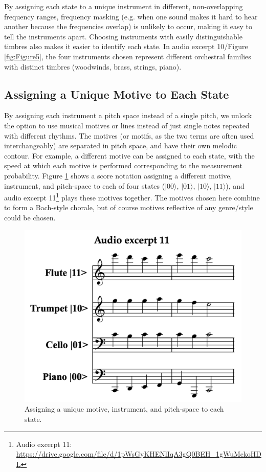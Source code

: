 \documentclass[10pt,twocolumn]{article}
\begin{document}
By assigning each state to a unique instrument in different, non-overlapping frequency ranges, frequency masking (e.g. when one sound makes it hard to hear another because the frequencies overlap) is unlikely to occur, making it easy to tell the instruments apart\cite{smyth2019}. Choosing instruments with easily distinguishable timbres also makes it easier to identify each state. In audio excerpt 10/Figure \ref{fig:Figure5}, the four instruments chosen represent different orchestral families with distinct timbres (woodwinds, brass, strings, piano). 

\subsection{Assigning a Unique Motive to Each State}

By assigning each instrument a pitch space instead of a single pitch, we unlock the option to use musical motives or lines instead of just single notes repeated with different rhythms. The motives (or motifs, as the two terms are often used interchangeably) are separated in pitch space, and have their own melodic contour. For example, a different motive can be assigned to each state, with the speed at which each motive is performed corresponding to the measurement probability. Figure \ref{fig:Figure6} shows a score notation assigning a different motive, instrument, and pitch-space to each of four states ($|00\rangle$, $|01\rangle$, $|10\rangle$, $|11\rangle$), and audio excerpt 11\footnote{Audio excerpt 11: \url{https://drive.google.com/file/d/1pWsGyKHENlIqA3gQ0BEH_1gWuMckoHDL}} plays these motives together. The motives chosen here combine to form a Bach-style chorale, but of course motives reflective of any genre/style could be chosen.

\begin{figure}[h]
\centering
  \includegraphics[width=.45\textwidth]{fig/Figure 6.png}
        \caption{Assigning a unique motive, instrument, and pitch-space to each state.}
\label{fig:Figure6}
\end{figure}
\end{document}
